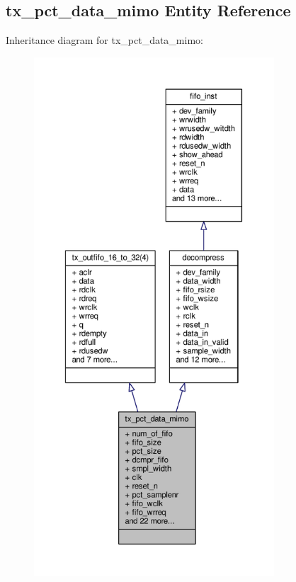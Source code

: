 \subsection{tx\+\_\+pct\+\_\+data\+\_\+mimo Entity Reference}
\label{classtx__pct__data__mimo}


Inheritance diagram for tx\+\_\+pct\+\_\+data\+\_\+mimo\+:\nopagebreak
\begin{figure}[H]
\begin{center}
\leavevmode
\includegraphics[height=550pt]{de/d3c/classtx__pct__data__mimo__inherit__graph}
\end{center}
\end{figure}


